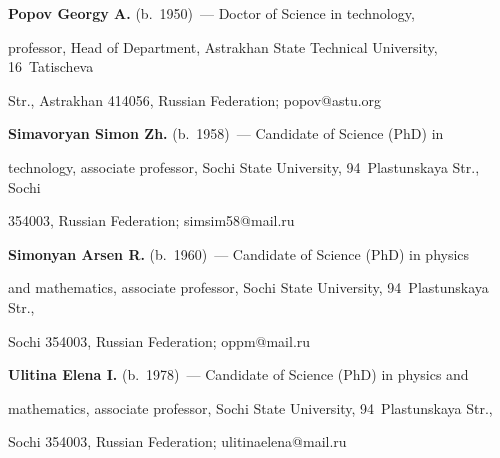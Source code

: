 

  


  \Contr


  


  \noindent


  \textbf{Popov Georgy A.} (b.\ 1950)~--- Doctor of Science in technology, 


professor, Head of Department, Astrakhan State Technical University, 16~Tatischeva 


Str., Astrakhan 414056, Russian Federation; \mbox{popov@astu.org}


  


  \vspace*{6pt}


  


  \noindent


  \textbf{Simavoryan Simon Zh.} (b.\ 1958)~--- Candidate of Science (PhD) in 


technology, associate professor, Sochi State University, 94~Plastunskaya Str., Sochi 


354003, Russian Federation; \mbox{simsim58@mail.ru}


  


  \vspace*{6pt}


  


  \noindent


  \textbf{Simonyan Arsen R.} (b.\ 1960)~--- Candidate of Science (PhD) in physics 


and mathematics, associate professor, Sochi State University, 94~Plastunskaya Str., 


Sochi 354003, Russian Federation; \mbox{oppm@mail.ru}


  


  \vspace*{6pt}


  


  \noindent


  \textbf{Ulitina Elena I.} (b.\ 1978)~--- Candidate of Science (PhD) in physics and 


mathematics, associate professor, Sochi State University, 94~Plastunskaya Str., 


Sochi 354003, Russian Federation; \mbox{ulitinaelena@mail.ru}


\label{end\stat}





\renewcommand{\bibname}{\protect\rm Литература} 



